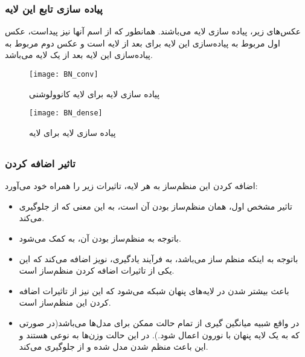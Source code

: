 \documentclass{article}
\begin{document}
\subsubsection{پیاده سازی تابع این لایه}
عکس‌های زیر، پیاده سازی لایه  می‌باشند. همانطور که از اسم آنها نیز پیداست، عکس اول مربوط به پیاده‌سازی این لایه برای بعد از لایه  است و عکس دوم مربوط به پیاده‌سازی این لایه بعد از یک لایه  می‌باشد.
\begin{figure}[H]
	\centerline{\texttt{[image: BN\_conv]}}
	\caption{پیاده سازی لایه  برای لایه کانوولوشنی
}
\end{figure}
\begin{figure}[H]
	\centerline{\texttt{[image: BN\_dense]}}
	\caption{پیاده سازی لایه  برای لایه 
}
\end{figure}
\subsection{}
\subsubsection{تاثیر اضافه کردن }
اضافه کردن این منظم‌ساز به هر لایه، تاثیرات زیر را همراه خود می‌آورد:
\begin{itemize}
	\item تاثیر مشخص اول، همان منظم‌ساز بودن آن است، به این معنی که از  جلوگیری می‌کند.
	\item باتوجه به منظم‌ساز بودن آن، به  کمک می‌شود.
	\item باتوجه به اینکه منظم ‌ساز می‌باشد، به فرآیند یادگیری، نویز اضافه می‌کند که این یکی از تاثیرات اضافه کردن منظم‌ساز است.
	\item باعث بیشتر شدن  در لایه‌های پنهان شبکه‌ می‌شود که این نیز از تاثیرات اضافه کردن این منظم‌ساز است.
	\item در واقع شبیه میانگین گیری از تمام  حالت ممکن برای مدل‌ها می‌باشد(در صورتی که به یک لایه پنهان با  نورون اعمال شود.). در این حالت وزن‌ها به نوعی  هستند و این باعث منظم شدن مدل شده و از  جلوگیری می‌کند.
\end{itemize} 
\end{document}
